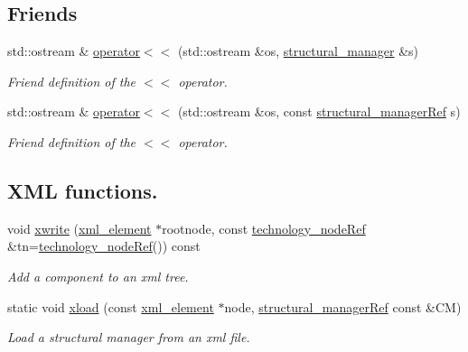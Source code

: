 \subsection*{Friends}
\begin{DoxyCompactItemize}
\item 
std\+::ostream \& \hyperlink{classstructural__manager_a0f747b30364b9fac0b9ced28b1631f32}{operator$<$$<$} (std\+::ostream \&os, \hyperlink{classstructural__manager}{structural\+\_\+manager} \&s)
\begin{DoxyCompactList}\small\item\em Friend definition of the $<$$<$ operator. \end{DoxyCompactList}\item 
std\+::ostream \& \hyperlink{classstructural__manager_acbd95dbbe26b42fd32680d2cbd994b08}{operator$<$$<$} (std\+::ostream \&os, const \hyperlink{structural__manager_8hpp_ab3136f0e785d8535f8d252a7b53db5b5}{structural\+\_\+manager\+Ref} s)
\begin{DoxyCompactList}\small\item\em Friend definition of the $<$$<$ operator. \end{DoxyCompactList}\end{DoxyCompactItemize}
\subsection*{X\+ML functions.}
\begin{DoxyCompactItemize}
\item 
void \hyperlink{classstructural__manager_a1357e1db0d3895ee2fd084a109f242d7}{xwrite} (\hyperlink{classxml__element}{xml\+\_\+element} $\ast$rootnode, const \hyperlink{technology__node_8hpp_a33dd193b7bd6b987bf0d8a770a819fa7}{technology\+\_\+node\+Ref} \&tn=\hyperlink{technology__node_8hpp_a33dd193b7bd6b987bf0d8a770a819fa7}{technology\+\_\+node\+Ref}()) const
\begin{DoxyCompactList}\small\item\em Add a component to an xml tree. \end{DoxyCompactList}\item 
static void \hyperlink{classstructural__manager_a13ea548d745b21b07a8cca52a67bb7cf}{xload} (const \hyperlink{classxml__element}{xml\+\_\+element} $\ast$node, \hyperlink{structural__manager_8hpp_ab3136f0e785d8535f8d252a7b53db5b5}{structural\+\_\+manager\+Ref} const \&CM)
\begin{DoxyCompactList}\small\item\em Load a structural manager from an xml file. \end{DoxyCompactList}\end{DoxyCompactItemize}


